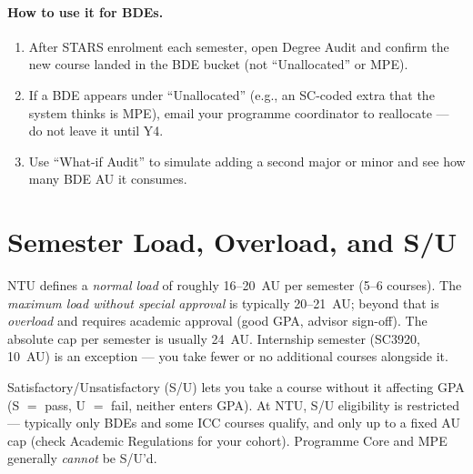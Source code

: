 \paragraph{How to use it for BDEs.}
\begin{enumerate}
    \item After STARS enrolment each semester, open Degree Audit and confirm the new course landed in the BDE bucket (not ``Unallocated'' or MPE).
    \item If a BDE appears under ``Unallocated'' (e.g., an SC-coded extra that the system thinks is MPE), email your programme coordinator to reallocate --- do not leave it until Y4.
    \item Use ``What-if Audit'' to simulate adding a second major or minor and see how many BDE AU it consumes.
\end{enumerate}

\section{Semester Load, Overload, and S/U}
\label{sec:overload}

\begin{definition}
NTU defines a \emph{normal load} of roughly 16--20~AU per semester (5--6 courses). The \emph{maximum load without special approval} is typically 20--21~AU; beyond that is \emph{overload} and requires academic approval (good GPA, advisor sign-off). The absolute cap per semester is usually 24~AU. Internship semester (SC3920, 10~AU) is an exception --- you take fewer or no additional courses alongside it.
\end{definition}

\begin{definition}[S/U option]
Satisfactory/Unsatisfactory (S/U) lets you take a course without it affecting GPA (S $=$ pass, U $=$ fail, neither enters GPA). At NTU, S/U eligibility is restricted --- typically only BDEs and some ICC courses qualify, and only up to a fixed AU cap (check Academic Regulations for your cohort). Programme Core and MPE generally \emph{cannot} be S/U'd.
\end{definition}

